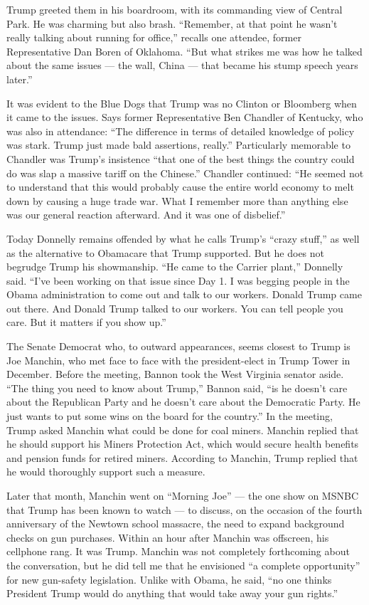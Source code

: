Trump greeted them in his boardroom, with its commanding view of Central
Park. He was charming but also brash. ``Remember, at that point he
wasn't really talking about running for office,'' recalls one attendee,
former Representative Dan Boren of Oklahoma. ``But what strikes me was
how he talked about the same issues --- the wall, China --- that became
his stump speech years later.''

It was evident to the Blue Dogs that Trump was no Clinton or Bloomberg
when it came to the issues. Says former Representative Ben Chandler of
Kentucky, who was also in attendance: ``The difference in terms of
detailed knowledge of policy was stark. Trump just made bald assertions,
really.'' Particularly memorable to Chandler was Trump's insistence
``that one of the best things the country could do was slap a massive
tariff on the Chinese.'' Chandler continued: ``He seemed not to
understand that this would probably cause the entire world economy to
melt down by causing a huge trade war. What I remember more than
anything else was our general reaction afterward. And it was one of
disbelief.''

Today Donnelly remains offended by what he calls Trump's ``crazy
stuff,'' as well as the alternative to Obamacare that Trump supported.
But he does not begrudge Trump his showmanship. ``He came to the Carrier
plant,'' Donnelly said. ``I've been working on that issue since Day 1. I
was begging people in the Obama administration to come out and talk to
our workers. Donald Trump came out there. And Donald Trump talked to our
workers. You can tell people you care. But it matters if you show up.''

The Senate Democrat who, to outward appearances, seems closest to Trump
is Joe Manchin, who met face to face with the president-elect in Trump
Tower in December. Before the meeting, Bannon took the West Virginia
senator aside. ``The thing you need to know about Trump,'' Bannon said,
``is he doesn't care about the Republican Party and he doesn't care
about the Democratic Party. He just wants to put some wins on the board
for the country.'' In the meeting, Trump asked Manchin what could be
done for coal miners. Manchin replied that he should support his Miners
Protection Act, which would secure health benefits and pension funds for
retired miners. According to Manchin, Trump replied that he would
thoroughly support such a measure.

Later that month, Manchin went on ``Morning Joe'' --- the one show on
MSNBC that Trump has been known to watch --- to discuss, on the occasion
of the fourth anniversary of the Newtown school massacre, the need to
expand background checks on gun purchases. Within an hour after Manchin
was offscreen, his cellphone rang. It was Trump. Manchin was not
completely forthcoming about the conversation, but he did tell me that
he envisioned ``a complete opportunity'' for new gun-safety legislation.
Unlike with Obama, he said, ``no one thinks President Trump would do
anything that would take away your gun rights.''


